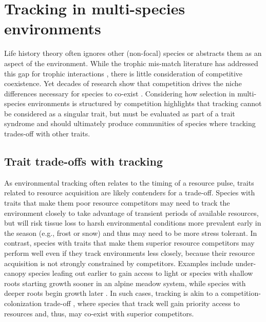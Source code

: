 \documentclass[11pt,letterpaper]{article}
\newcommand{\R}[1]{\label{}\linelabel{#1}}
\begin{document}
\section{Tracking in multi-species environments} 
Life history theory often ignores other (non-focal) species or abstracts them as an aspect of the environment. While the trophic mis-match literature has addressed this gap for trophic interactions \citep{Visser:2005bg,vissergienapp2019}, there is little consideration of competitive coexistence. \R{r2whycomp}Yet decades of research show that competition drives the niche differences necessary for species to co-exist \citep{Hutchinson:1959xi,Chesson:2000vd}. Considering how selection in multi-species environments is structured by competition highlights that tracking cannot be considered as a singular trait, but must be evaluated as part of a trait syndrome \citep[or mosaic of traits,][]{Ghalambor2007} and should ultimately produce communities of species where tracking trades-off with other traits.

\subsection{Trait trade-offs with tracking} 

As environmental tracking often relates to the timing of a resource pulse, traits related to resource acquisition are likely contenders for a trade-off. Species with traits that make them poor resource competitors may need to track the environment closely to take advantage of transient periods of available resources, but will risk tissue loss to harsh environmental conditions more prevalent early in the season (e.g., frost or snow) and thus may need to be more stress tolerant. In contrast, species with traits that make them superior resource competitors may perform well even if they track environments less closely, because their resource acquisition is not strongly constrained by competitors. Examples include under-canopy species leafing out earlier to gain access to light \citep{heberling2019} or species with shallow roots starting growth sooner in an alpine meadow system, while species with deeper roots begin growth later \citep{Zhu2016BioLetters}. In such cases, tracking is akin to a competition-colonization trade-off \citep{Amarasekare:2003tq}, where species that track well gain priority access to resources and, thus, may co-exist with superior competitors. 

\end{document}
